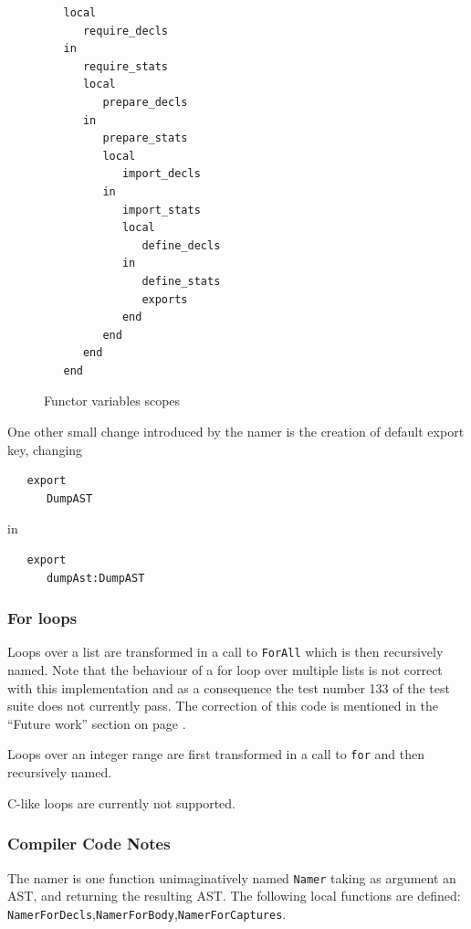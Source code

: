 \documentclass[a4paper]{memoir}
\begin{document}
\begin{figure}[ht]
\begin{lstlisting}
   local
      require_decls
   in
      require_stats
      local
         prepare_decls
      in
         prepare_stats
         local
            import_decls
         in
            import_stats
            local
               define_decls
            in
               define_stats
               exports
            end
         end
      end
   end
\end{lstlisting}
\caption{Functor variables scopes}
\label{fig:functors_scope}
\end{figure}

One other small change introduced by the namer is the creation of default export
key, changing
\begin{lstlisting}
   export
      DumpAST
\end{lstlisting}
in
\begin{lstlisting}
   export
      dumpAst:DumpAST
\end{lstlisting}




\subsubsection{For loops}
Loops over a list are transformed in a call to \lstinline!ForAll! which is then
recursively named. Note that the behaviour of a for loop over multiple lists is not correct with this implementation and
as a consequence the test number 133 of the test suite does not currently pass. The correction of this code is mentioned in the ``Future work'' section on page \pageref{sec:futurework}.

Loops over an integer range are first transformed in a call
to \lstinline!for! and then recursively named.

C-like loops are currently not supported.

\subsubsection{Compiler Code Notes}
The namer is one function unimaginatively named \lstinline!Namer! taking as argument an AST, and returning the resulting AST.
The following local functions are defined: \lstinline!NamerForDecls!,\lstinline!NamerForBody!,\lstinline!NamerForCaptures!.
\end{document}
